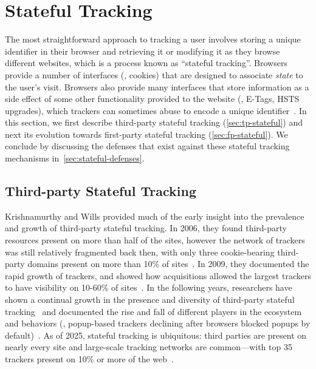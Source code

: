 \section{Stateful Tracking}
\label{sec:stateful-tracking}
The most straightforward approach to tracking a user involves storing a unique identifier in their browser and retrieving it or modifying it as they browse different websites, which is a process known as ``stateful tracking''. 
%
Browsers provide a number of interfaces (\eg{}, cookies) that are designed to associate \textit{state} to the user's visit. 
%
Browsers also provide many interfaces that store information as a side effect of some other functionality provided to the website (\eg{}, E-Tags, HSTS upgrades), which trackers can sometimes abuse to encode a unique identifier~\cite{englehardtAutomatedDiscoveryPrivacy2018,ashkansoltaniFlashCookiesPrivacy2011,solomosTalesFaviconsCaches2021}.
%
In this section, we first describe third-party stateful tracking (\autoref{sec:tp-stateful}) and next its evolution towards first-party stateful tracking (\autoref{sec:fp-stateful}).
%
We conclude by discussing the defenses that exist against these stateful tracking mechanisms in~\autoref{sec:stateful-defenses}.

\subsection{Third-party Stateful Tracking}
\label{sec:tp-stateful}

Krishnamurthy and Wills provided much of the early insight into the prevalence and growth of third-party stateful tracking. 
%
In 2006, they found third-party resources present on more than half of the sites, however the network of trackers was still relatively fragmented back then, with only three cookie-bearing third-party domains present on more than 10\% of sites~\cite{krishnamurthyGeneratingPrivacyFootprint2006}. 
%
In 2009, they documented the rapid growth of trackers, and showed how acquisitions allowed the largest trackers to have visibility on 10-60\% of sites~\cite{krishnamurthyPrivacyDiffusionWeb2009}. 
%
In the following years, researchers have shown a continual growth in the presence and diversity of third-party stateful tracking~\cite{soltaniFlashCookiesPrivacy2009,roesnerDetectingDefendingThirdparty2012,mayerThirdPartyWebTracking2012,acarFPDetectiveDustingWeb2013,eubankShiningFloodlightsMobile2013, altaweelWebPrivacyCensus2015,englehardtOnlineTracking1millionsite2016,lernerInternetJonesRaiders2016,schelterUbiquityWebTracking2018} and documented the rise and fall of different players in the ecosystem and behaviors (\eg{}, popup-based trackers declining after browsers blocked popups by default)~\cite{lernerInternetJonesRaiders2016}.
%
As of 2025, stateful tracking is ubiquitous: third parties are present on nearly every site and large-scale tracking networks are common---with top 35 trackers present on 10\% or more of the web~\cite{duckduckgoTrackerRadarWiki2024}.


